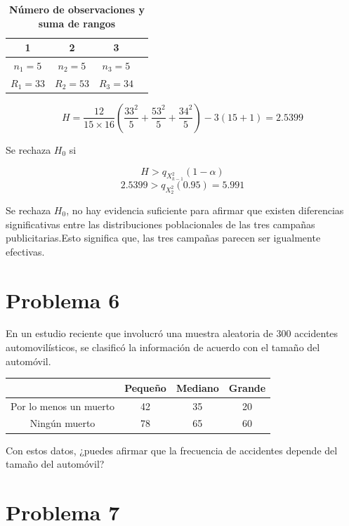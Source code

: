 \documentclass{article}
\begin{document}
\begin{table}[ht]
    \centering
    \caption{\textbf{Número de observaciones y suma de rangos}}
    \begin{tabular}{cccc}
        \toprule
        1          & 2          & 3          \\
        \midrule
        $n_1 = 5$  & $n_2 = 5$  & $n_3 = 5$  \\
        $R_1 = 33$ & $R_2 = 53$ & $R_3 = 34$ \\
        \bottomrule
    \end{tabular}
\end{table}

\[ H = \frac{12}{15 \times 16} \left(\frac{33^2}{5} + \frac{53^2}{5} + \frac{34^2}{5} \right) - 3(15 + 1) = 2.5399 \]

Se rechaza $H_0$ si

\[H > q_{X^{2}_{k-1}}(1 - \alpha)\]
\[2.5399 > q_{X^{2}_{2}}(0.95) = 5.991\]

Se rechaza \(H_0\), no hay evidencia suficiente para afirmar que existen diferencias significativas entre las distribuciones poblacionales de las tres campañas publicitarias.Esto significa que, las tres campañas parecen ser igualmente efectivas.

\section{Problema 6}
En un estudio reciente que involucró una muestra aleatoria de 300 accidentes automovilísticos, se clasificó la información de acuerdo con el tamaño del automóvil.

\begin{center}
    \begin{tabular}{c| c c c}
                               & Pequeño & Mediano & Grande \\
        \hline
        Por lo menos un muerto & 42      & 35      & 20     \\
        Ningún muerto          & 78      & 65      & 60     \\
    \end{tabular}
\end{center}

Con estos datos,  ¿puedes afirmar que la frecuencia de accidentes depende del  tamaño del automóvil?

\section{Problema 7}
\end{document}
